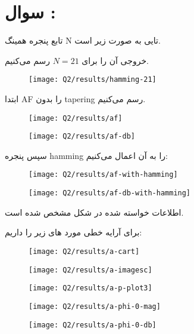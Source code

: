 \documentclass[12pt,onecolumn,a4paper]{article}
\newcommand\question[1][\space]{
	\section[سوال \tartibi{section}]
	{سوال \tartibi{section}: #1}
}
\begin{document}
	
	
	
	\FloatBarrier\question[]%
	
	
	تابع 	پنجره همینگ N تایی  به صورت زیر است.
	
	\begin{latin}
		
	\end{latin}
خروجی آن را برای $N=21$ رسم می‌کنیم.
	
\begin{figure}[H]
	\centering
	\texttt{[image: Q2/results/hamming-21]}
	\caption{}
	\label{fig:hamming-21}
\end{figure}

ابتدا AF را بدون tapering رسم می‌کنیم.
	
	
\begin{figure}[H]
	\centering
	\texttt{[image: Q2/results/af]}
	\caption{}
	\label{fig:af}
\end{figure}
	
\begin{figure}[H]
	\centering
	\texttt{[image: Q2/results/af-db]}
	\caption{}
	\label{fig:af-db}
\end{figure}
	
	سپس پنجره hamming را به آن اعمال می‌کنیم:
	
\begin{figure}[H]
	\centering
	\texttt{[image: Q2/results/af-with-hamming]}
	\caption{}
	\label{fig:af-with-hamming}
\end{figure}
\begin{figure}[H]
	\centering
	\texttt{[image: Q2/results/af-db-with-hamming]}
	\caption{}
	\label{fig:af-db-with-hamming}
\end{figure}

اطلاعات خواسته شده در شکل مشخص شده است.


برای آرایه خطی مورد های زیر را داریم:

\begin{figure}[H]
	\centering
	\texttt{[image: Q2/results/a-cart]}
	\caption{}
	\label{fig:a-cart}
\end{figure}
\begin{figure}[H]
	\centering
	\texttt{[image: Q2/results/a-imagesc]}
	\caption{}
	\label{fig:a-imagesc}
\end{figure}
\begin{figure}[H]
	\centering
	\texttt{[image: Q2/results/a-p-plot3]}
	\caption{}
	\label{fig:a-p-plot3}
\end{figure}
\begin{figure}[H]
	\centering
	\texttt{[image: Q2/results/a-phi-0-mag]}
	\caption{}
	\label{fig:a-phi-0-mag}
\end{figure}
\begin{figure}[H]
	\centering
	\texttt{[image: Q2/results/a-phi-0-db]}
	\caption{}
	\label{fig:a-phi-0-db}
\end{figure}
\end{document}

